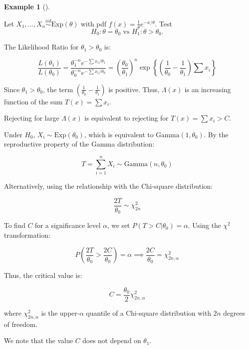 \documentclass[
  letterpaper,
  DIV=11,
  numbers=noendperiod]{scrreprt}
\renewcommand{\[}{\begin{equation}}
\renewcommand{\]}{\end{equation}}
\theoremstyle{definition}
\theoremstyle{plain}
\theoremstyle{plain}
\theoremstyle{plain}
\theoremstyle{definition}
\newtheorem{example}{Example}[chapter]
\theoremstyle{plain}
\theoremstyle{remark}
\begin{document}
\begin{example}[]\protect\hypertarget{exm-mlr-gamma}{}\label{exm-mlr-gamma}

Let \(X_1, \dots, X_n \overset{iid}{\sim} \text{Exp}(\theta)\) with pdf
\(f(x) = \frac{1}{\theta} e^{-x/\theta}\). Test
\[H_0: \theta = \theta_0 \text{ vs } H_1: \theta > \theta_0.\]

The Likelihood Ratio for \(\theta_1 > \theta_0\) is:

\[
\frac{L(\theta_1)}{L(\theta_0)} = \frac{\theta_1^{-n} e^{-\sum x_i / \theta_1}}{\theta_0^{-n} e^{-\sum x_i / \theta_0}} = \left(\frac{\theta_0}{\theta_1}\right)^n \exp \left\{ \left( \frac{1}{\theta_0} - \frac{1}{\theta_1} \right) \sum x_i \right\}
\]

Since \(\theta_1 > \theta_0\), the term
\((\frac{1}{\theta_0} - \frac{1}{\theta_1})\) is positive. Thus,
\(\Lambda(x)\) is an increasing function of the sum
\(T (x) = \sum x_i\).

Rejecting for large \(\Lambda(x)\) is equivalent to rejecting for
\(T(x)=\sum x_i > C\).

Under \(H_0\), \(X_i \sim \text{Exp}(\theta_0)\), which is equivalent to
\(\text{Gamma}(1, \theta_0)\). By the reproductive property of the Gamma
distribution:

\[T = \sum_{i=1}^n X_i \sim \text{Gamma}(n, \theta_0)\]

Alternatively, using the relationship with the Chi-square distribution:

\[\frac{2T}{\theta_0} \sim \chi^2_{2n}\]

To find \(C\) for a significance level \(\alpha\), we set
\(P(T > C | \theta_0) = \alpha\). Using the \(\chi^2\) transformation:

\[P\left(\frac{2T}{\theta_0} > \frac{2C}{\theta_0}\right) = \alpha \implies \frac{2C}{\theta_0} = \chi^2_{2n, \alpha}\]

Thus, the critical value is:

\[C = \frac{\theta_0}{2} \chi^2_{2n, \alpha}\]

where \(\chi^2_{2n, \alpha}\) is the upper-\(\alpha\) quantile of a
Chi-square distribution with \(2n\) degrees of freedom.

\begin{tcolorbox}[enhanced jigsaw, toptitle=1mm, arc=.35mm, left=2mm, toprule=.15mm, bottomtitle=1mm, opacityback=0, rightrule=.15mm, title=\textcolor{quarto-callout-important-color}{\faExclamation}\hspace{0.5em}{Important}, colback=white, coltitle=black, titlerule=0mm, colbacktitle=quarto-callout-important-color!10!white, breakable, leftrule=.75mm, bottomrule=.15mm, opacitybacktitle=0.6, colframe=quarto-callout-important-color-frame]

We note that the value \(C\) does not depend on \(\theta_1\).

\end{tcolorbox}

\end{example}
\end{document}
